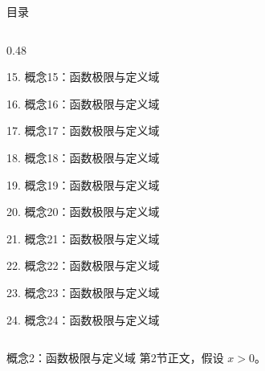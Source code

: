 \documentclass[aspectratio=169,10pt,fontset=fandol]{ctexbeamer}
\begin{document}
\begin{frame}[t,fragile]{目录}
\begin{columns}[T,onlytextwidth]
\begin{column}{0.48\textwidth}
{\color{gray!40}\small 15. 概念15：函数极限与定义域\par}\vspace{0.22em}
{\color{gray!40}\small 16. 概念16：函数极限与定义域\par}\vspace{0.22em}
{\color{gray!40}\small 17. 概念17：函数极限与定义域\par}\vspace{0.22em}
{\color{gray!40}\small 18. 概念18：函数极限与定义域\par}\vspace{0.22em}
{\color{gray!40}\small 19. 概念19：函数极限与定义域\par}\vspace{0.22em}
{\color{gray!40}\small 20. 概念20：函数极限与定义域\par}\vspace{0.22em}
{\color{gray!40}\small 21. 概念21：函数极限与定义域\par}\vspace{0.22em}
{\color{gray!40}\small 22. 概念22：函数极限与定义域\par}\vspace{0.22em}
{\color{gray!40}\small 23. 概念23：函数极限与定义域\par}\vspace{0.22em}
{\color{gray!40}\small 24. 概念24：函数极限与定义域\par}\vspace{0.22em}
\end{column}
\end{columns}
\end{frame}
\begin{frame}[t,fragile]{概念2：函数极限与定义域}
\normalsize
{\normalsize
第2节正文，假设 $x>0$。
}
\end{frame}
\end{document}
